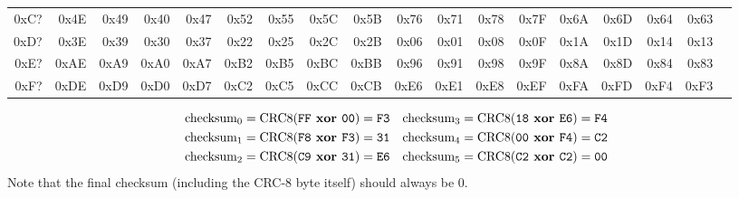 \begin{table}[h]
{\begin{tabular}{|r||r|r|r|r|r|r|r|r|r|r|r|r|r|r|r|r|r|}
0xC? & 0x4E & 0x49 & 0x40 & 0x47 & 0x52 & 0x55 & 0x5C & 0x5B & 0x76 & 0x71 & 0x78 & 0x7F & 0x6A & 0x6D & 0x64 & 0x63 \\
0xD? & 0x3E & 0x39 & 0x30 & 0x37 & 0x22 & 0x25 & 0x2C & 0x2B & 0x06 & 0x01 & 0x08 & 0x0F & 0x1A & 0x1D & 0x14 & 0x13 \\
0xE? & 0xAE & 0xA9 & 0xA0 & 0xA7 & 0xB2 & 0xB5 & 0xBC & 0xBB & 0x96 & 0x91 & 0x98 & 0x9F & 0x8A & 0x8D & 0x84 & 0x83 \\
0xF? & 0xDE & 0xD9 & 0xD0 & 0xD7 & 0xC2 & 0xC5 & 0xCC & 0xCB & 0xE6 & 0xE1 & 0xE8 & 0xEF & 0xFA & 0xFD & 0xF4 & 0xF3 \\
\hline
\end{tabular}
}
\end{table}
\begin{align*}
\text{checksum}_0 = \text{CRC8}(\texttt{FF}\textbf{ xor }\texttt{00}) = \texttt{F3} & &
\text{checksum}_3 = \text{CRC8}(\texttt{18}\textbf{ xor }\texttt{E6}) = \texttt{F4} \\
\text{checksum}_1 = \text{CRC8}(\texttt{F8}\textbf{ xor }\texttt{F3}) = \texttt{31} & &
\text{checksum}_4 = \text{CRC8}(\texttt{00}\textbf{ xor }\texttt{F4}) = \texttt{C2} \\
\text{checksum}_2 = \text{CRC8}(\texttt{C9}\textbf{ xor }\texttt{31}) = \texttt{E6} & &
\text{checksum}_5 = \text{CRC8}(\texttt{C2}\textbf{ xor }\texttt{C2}) = \texttt{00} \\
\end{align*}
Note that the final checksum (including the CRC-8 byte itself)
should always be 0.


\clearpage

